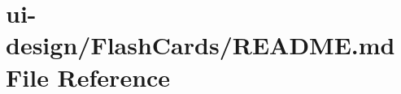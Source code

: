 \hypertarget{FlashCards_2README_8md}{}\section{ui-\/design/\+Flash\+Cards/\+R\+E\+A\+D\+ME.md File Reference}
\label{FlashCards_2README_8md}
